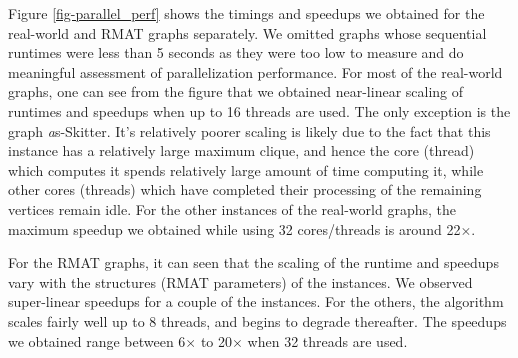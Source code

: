 Figure \ref{fig-parallel_perf} shows the timings and speedups we obtained for the real-world and RMAT graphs separately. We omitted graphs whose sequential runtimes were less than 5 seconds as they were too low to measure and do meaningful assessment of parallelization performance. For most of the real-world graphs, one can see from the figure that we obtained near-linear scaling of runtimes and speedups when up to 16 threads are used. The only exception is the graph 
{\emph as-Skitter}. It's relatively poorer scaling is likely due to the fact that this instance has a relatively large maximum clique, and hence the core (thread) which computes it spends relatively large amount of time computing it, while other cores (threads) which have completed their processing of the remaining vertices remain idle. 
For the other instances of the real-world graphs, the maximum speedup we obtained 
while using 32 cores/threads is around 22$\times$. 

For the RMAT graphs, it can seen that the scaling of the runtime and speedups vary with the structures (RMAT parameters) of the instances. We observed super-linear speedups for a couple of the instances. For the others, the algorithm scales fairly well up to 8 threads, and begins to
degrade thereafter. The speedups we obtained range between 6$\times$  to 20$\times$ when 32 threads are used.









